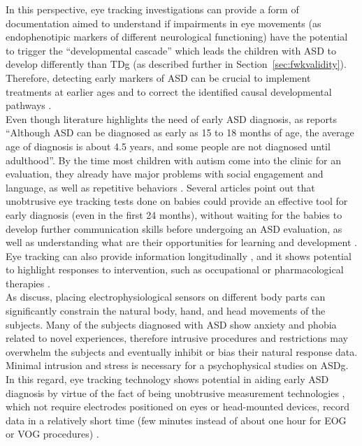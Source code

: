 In this perspective, eye tracking investigations can provide a form of documentation aimed to understand if impairments in eye movements (as endophenotipic markers of different neurological functioning) have the potential to trigger the “developmental cascade” \citep{towie2016screening}  which leads the children with ASD to develop differently than TDg (as described further in Section~\ref{sec:fwkvalidity}). Therefore, detecting early markers of ASD can be crucial to implement treatments at earlier ages and to correct the identified causal developmental pathways \citep{young2009gazechildren}.\\
Even though literature highlights the need of early ASD diagnosis, as \cite{apa2017diagnosis} reports “Although ASD can be diagnosed as early as 15 to 18 months of age, the average age of diagnosis is about 4.5 years, and some people are not diagnosed until adulthood”. By the time most children with autism come into the clinic for an evaluation, they already have major problems with social engagement and language, as well as repetitive behaviors \citep{bourzac2012development}.
Several articles \citep{boraston2007eyetrackingASD,jones2008preferencesocial,zwaigenbaum2005behaviorchildren} point out that unobtrusive eye tracking tests done on babies could provide an effective tool for early diagnosis (even in the first 24 months), without waiting for the babies to develop further communication skills before undergoing an ASD evaluation, as well as understanding what are their opportunities for learning and development \citep{falck-ytter2013eyetrackingASD}.
Eye tracking can also provide information longitudinally \citep{zwaigenbaum2005behaviorchildren}, and it shows potential to highlight responses to intervention, such as occupational  or pharmacological therapies \citep{johnson2016review}.\\
As \cite{samad2017markers} discuss, placing electrophysiological sensors on different body parts can significantly constrain the natural body, hand, and head movements of the subjects. Many of the subjects diagnosed with ASD show anxiety and phobia related to novel experiences, therefore intrusive procedures and restrictions may overwhelm the subjects and eventually inhibit or bias their natural response data. Minimal intrusion and stress is necessary for a psychophysical studies on ASDg. In this regard, eye tracking technology shows potential in aiding early ASD diagnosis by virtue of the fact of being unobtrusive measurement technologies \citep{bolte2016detection,falck-ytter2013eyetrackingASD}, which not require electrodes positioned on eyes or head-mounted devices, record data in a relatively short time (few minutes instead of about one hour for EOG or VOG procedures) \citep{giordano2017eyetrackersystem}.\\
